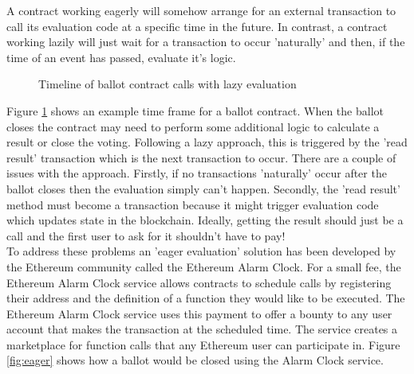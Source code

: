 A contract working eagerly will somehow arrange for an external transaction to call its evaluation code at a specific time in the future. In contrast, a contract working lazily will just wait for a transaction to occur 'naturally' and then, if the time of an event has passed, evaluate it's logic.\\
\begin{figure}
\centering
{}
\decoRule
\caption[Lazy Contract Scheduling]{Timeline of ballot contract calls with lazy evaluation}
\label{fig:lazy}
\end{figure}
Figure \ref{fig:lazy} shows an example time frame for a ballot contract. When the ballot closes the contract may need to perform some additional logic to calculate a result or close the voting. Following a lazy approach, this is triggered by the 'read result' transaction which is the next transaction to occur. There are a couple of issues with the approach. Firstly, if no transactions 'naturally' occur after the ballot closes then the evaluation simply can't happen. Secondly, the 'read result' method must become a transaction because it might trigger evaluation code which updates state in the blockchain. Ideally, getting the result should just be a call and the first user to ask for it shouldn't have to pay!\\

To address these problems an 'eager evaluation' solution has been developed by the Ethereum community called the Ethereum Alarm Clock. For a small fee, the Ethereum Alarm Clock service allows contracts to schedule calls by registering their address and the definition of a function they would like to be executed. The Ethereum Alarm Clock service uses this payment to offer a bounty to any user account that makes the transaction at the scheduled time. The service creates a marketplace for function calls that any Ethereum user can participate in. Figure \ref{fig:eager} shows how a ballot would be closed using the Alarm Clock service.\\

